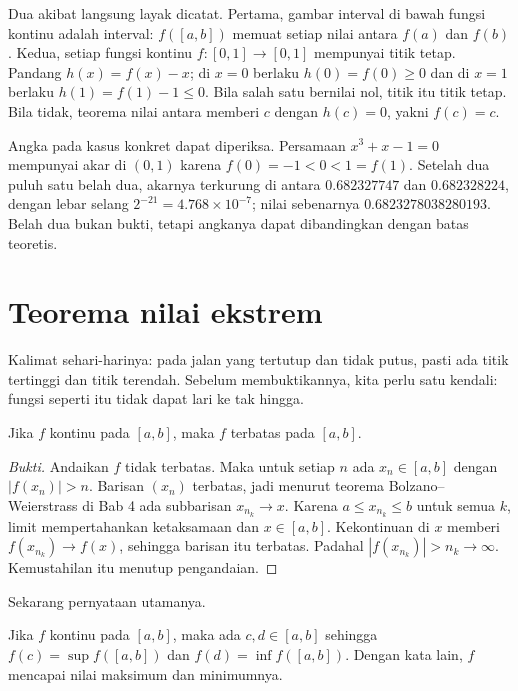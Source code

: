 Dua akibat langsung layak dicatat. Pertama, gambar interval di bawah fungsi kontinu
adalah interval: $f([a,b])$ memuat setiap nilai antara $f(a)$ dan $f(b)$. Kedua,
setiap fungsi kontinu $f\colon[0,1]\to[0,1]$ mempunyai titik tetap. Pandang
$h(x)=f(x)-x$; di $x=0$ berlaku $h(0)=f(0)\ge 0$ dan di $x=1$ berlaku
$h(1)=f(1)-1\le 0$. Bila salah satu bernilai nol, titik itu titik tetap. Bila tidak,
teorema nilai antara memberi $c$ dengan $h(c)=0$, yakni $f(c)=c$.

Angka pada kasus konkret dapat diperiksa. Persamaan $x^{3}+x-1=0$ mempunyai akar di
$(0,1)$ karena $f(0)=-1<0<1=f(1)$. Setelah dua puluh satu belah dua, akarnya terkurung
di antara $0.682327747$ dan $0.682328224$, dengan lebar selang $2^{-21}=4.768\times10^{-7}$;
nilai sebenarnya $0.6823278038280193$. Belah dua bukan bukti, tetapi angkanya dapat
dibandingkan dengan batas teoretis.

\section{Teorema nilai ekstrem}

Kalimat sehari-harinya: pada jalan yang tertutup dan tidak putus, pasti ada titik
tertinggi dan titik terendah. Sebelum membuktikannya, kita perlu satu kendali: fungsi
seperti itu tidak dapat lari ke tak hingga.

\begin{lemma}
Jika $f$ kontinu pada $[a,b]$, maka $f$ terbatas pada $[a,b]$.
\end{lemma}

\begin{proof}[Bukti]
Andaikan $f$ tidak terbatas. Maka untuk setiap $n$ ada $x_{n}\in[a,b]$ dengan
$|f(x_{n})|>n$. Barisan $(x_{n})$ terbatas, jadi menurut teorema
Bolzano--Weierstrass di Bab 4 ada subbarisan $x_{n_{k}}\to x$. Karena
$a\le x_{n_{k}}\le b$ untuk semua $k$, limit mempertahankan ketaksamaan dan
$x\in[a,b]$. Kekontinuan di $x$ memberi $f(x_{n_{k}})\to f(x)$, sehingga barisan itu
terbatas. Padahal $|f(x_{n_{k}})|>n_{k}\to\infty$. Kemustahilan itu menutup
pengandaian.
\end{proof}

Sekarang pernyataan utamanya.

\begin{teorema}
Jika $f$ kontinu pada $[a,b]$, maka ada $c,d\in[a,b]$ sehingga
$f(c)=\sup f([a,b])$ dan $f(d)=\inf f([a,b])$. Dengan kata lain, $f$ mencapai nilai
maksimum dan minimumnya.
\end{teorema}

